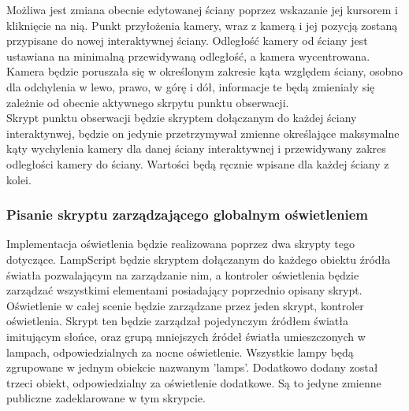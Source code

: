 \documentclass{article} %
\begin{document}
            Możliwa jest zmiana obecnie edytowanej ściany poprzez wskazanie jej kursorem i kliknięcie na nią. Punkt przyłożenia kamery, wraz z kamerą i jej pozycją zostaną przypisane do nowej interaktywnej ściany. Odległość kamery od ściany jest ustawiana na minimalną przewidywaną odległość, a kamera wycentrowana.
            \\
            
            Kamera będzie poruszała się w określonym zakresie kąta względem ściany, osobno dla odchylenia w lewo, prawo, w górę i dół, informacje te będą zmieniały się zależnie od obecnie aktywnego skrpytu punktu obserwacji. 
            \\
            
            Skrypt punktu obserwacji będzie skryptem dołączanym do każdej ściany interaktynwej, będzie on jedynie przetrzymywał zmienne określające maksymalne kąty wychylenia kamery dla danej ściany interaktywnej i przewidywany zakres odległości kamery do ściany. Wartości będą ręcznie wpisane dla każdej ściany z kolei.
            \\
            
        \subsubsection*{Pisanie skryptu zarządzającego globalnym oświetleniem}
            Implementacja oświetlenia będzie realizowana poprzez dwa skrypty tego dotyczące. LampScript będzie skryptem dołączanym do każdego obiektu źródła światła pozwalającym na zarządzanie nim, a kontroler oświetlenia będzie zarządzać wszystkimi elementami posiadający poprzednio opisany skrypt.
            \\
        
            Oświetlenie w całej scenie będzie zarządzane przez jeden skrypt, kontroler oświetlenia. Skrypt ten będzie zarządzał pojedynczym źródłem światła imitującym słońce, oraz grupą mniejszych źródeł światła umieszczonych w lampach, odpowiedzialnych za nocne oświetlenie. Wszystkie lampy będą zgrupowane w jednym obiekcie nazwanym 'lamps'. Dodatkowo dodany został trzeci obiekt, odpowiedzialny za oświetlenie dodatkowe. Są to jedyne zmienne publiczne zadeklarowane w tym skrypcie.
            \\
            
\end{document}
